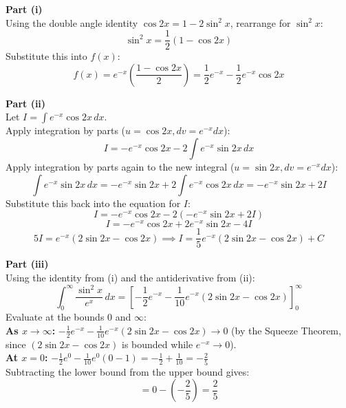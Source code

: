 \begin{solution}
\textbf{Part (i)} \\
Using the double angle identity $\cos 2x = 1 - 2\sin^2 x$, rearrange for $\sin^2 x$:
$$\sin^2 x = \frac{1}{2}(1 - \cos 2x)$$
Substitute this into $f(x)$:
$$f(x) = e^{-x} \left( \frac{1 - \cos 2x}{2} \right) = \frac{1}{2} e^{-x} - \frac{1}{2} e^{-x} \cos 2x$$

\textbf{Part (ii)} \\
Let $I = \int e^{-x} \cos 2x \, dx$. \\
Apply integration by parts ($u = \cos 2x, dv = e^{-x}dx$):
$$I = -e^{-x} \cos 2x - 2 \int e^{-x} \sin 2x \, dx$$
Apply integration by parts again to the new integral ($u = \sin 2x, dv = e^{-x}dx$):
$$\int e^{-x} \sin 2x \, dx = -e^{-x} \sin 2x + 2 \int e^{-x} \cos 2x \, dx = -e^{-x} \sin 2x + 2I$$
Substitute this back into the equation for $I$:
$$I = -e^{-x} \cos 2x - 2(-e^{-x} \sin 2x + 2I)$$
$$I = -e^{-x} \cos 2x + 2e^{-x} \sin 2x - 4I$$
$$5I = e^{-x}(2\sin 2x - \cos 2x) \implies I = \frac{1}{5} e^{-x}(2\sin 2x - \cos 2x) + C$$

\textbf{Part (iii)} \\
Using the identity from (i) and the antiderivative from (ii):
$$\int_0^\infty \frac{\sin^2 x}{e^x} \, dx = \left[ -\frac{1}{2}e^{-x} - \frac{1}{10}e^{-x}(2\sin 2x - \cos 2x) \right]_0^\infty$$
Evaluate at the bounds $0$ and $\infty$: \\
\textbf{As $x \to \infty$:} $-\frac{1}{2}e^{-x} - \frac{1}{10}e^{-x}(2\sin 2x - \cos 2x) \to 0$ (by the Squeeze Theorem, since $(2\sin 2x - \cos 2x)$ is bounded while $e^{-x} \to 0$). \\
\textbf{At $x = 0$:} $-\frac{1}{2}e^0 - \frac{1}{10}e^0(0 - 1) = -\frac{1}{2} + \frac{1}{10} = -\frac{2}{5}$ \\
Subtracting the lower bound from the upper bound gives:
$$= 0 - \left(-\frac{2}{5}\right) = \frac{2}{5}$$
\end{solution}

